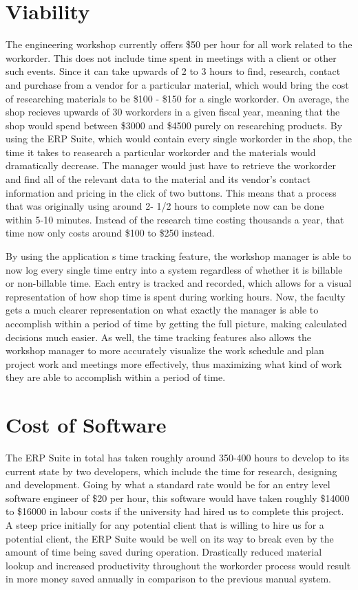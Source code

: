 {{{\section{Viability}

The engineering workshop currently offers \$50 per hour for all work related to the workorder. This does not include time spent in meetings with a client or other such events. Since it can take upwards of 2 to 3 hours to find, research, contact and purchase from a vendor for a particular material, which would bring the cost of researching materials to be \$100 - \$150 for a single workorder. On average, the shop recieves upwards of 30 workorders in a given fiscal year, meaning that the shop would spend between \$3000 and \$4500 purely on researching products. By using the ERP Suite, which would contain every single workorder in the shop, the time it takes to reasearch a particular workorder and the materials would dramatically decrease. The manager would just have to retrieve the workorder and find all of the relevant data to the material and its vendor's contact information and pricing in the click of two buttons. This means that a process that was originally using around 2- 1/2 hours to complete now can be done within 5-10 minutes. Instead of the research time costing thousands a year, that time now only costs around \$100 to \$250 instead. 
\newline
{\setlength{\parindent}{0cm}
 
By using the application
s time tracking feature, the workshop manager is able to now log every single time entry into a system regardless of whether it is billable or non-billable time. Each entry is tracked and recorded, which allows for a visual representation of how shop time is spent during working hours. Now, the faculty gets a much clearer representation on what exactly the manager is able to accomplish within a period of time by getting the full picture, making calculated decisions much easier. As well, the time tracking features also allows the workshop manager to more accurately visualize the work schedule and plan project work and meetings more effectively, thus maximizing what kind of work they are able to accomplish within a period of time.  

\section{Cost of Software}
The ERP Suite in total has taken roughly around 350-400 hours to develop to its current state by two developers, which include the time for research, designing and development. Going by what a standard rate would be for an entry level software engineer of \$20 per hour, this software would have taken roughly \$14000 to \$16000 in labour costs if the university had hired us to complete this project. A steep price initially for any potential client that is willing to hire us for a potential client, the ERP Suite would be well on its way to break even by the amount of time being saved during operation. Drastically reduced material lookup and increased productivity throughout the workorder process would result in more money saved annually in comparison to the previous manual system. 

}}}}
